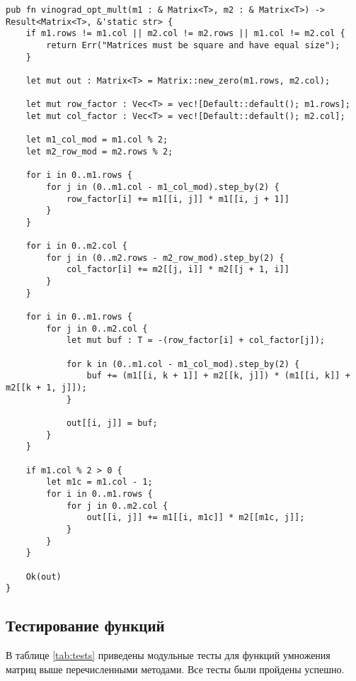 \begin{lstlisting}[caption=Оптимизированный алгоритм умножения матриц Винограда, label=list:vinograd, language={}]
pub fn vinograd_opt_mult(m1 : & Matrix<T>, m2 : & Matrix<T>) -> Result<Matrix<T>, &'static str> {
    if m1.rows != m1.col || m2.col != m2.rows || m1.col != m2.col {
        return Err("Matrices must be square and have equal size");
    }

    let mut out : Matrix<T> = Matrix::new_zero(m1.rows, m2.col);

    let mut row_factor : Vec<T> = vec![Default::default(); m1.rows];
    let mut col_factor : Vec<T> = vec![Default::default(); m2.col];

    let m1_col_mod = m1.col % 2;
    let m2_row_mod = m2.rows % 2;

    for i in 0..m1.rows {
        for j in (0..m1.col - m1_col_mod).step_by(2) {
            row_factor[i] += m1[[i, j]] * m1[[i, j + 1]]
        }
    }

    for i in 0..m2.col {
        for j in (0..m2.rows - m2_row_mod).step_by(2) {
            col_factor[i] += m2[[j, i]] * m2[[j + 1, i]]
        }
    }

    for i in 0..m1.rows {
        for j in 0..m2.col {
            let mut buf : T = -(row_factor[i] + col_factor[j]);

            for k in (0..m1.col - m1_col_mod).step_by(2) {
                buf += (m1[[i, k + 1]] + m2[[k, j]]) * (m1[[i, k]] + m2[[k + 1, j]]);
            }

            out[[i, j]] = buf;
        }
    }

    if m1.col % 2 > 0 {
        let m1c = m1.col - 1;
        for i in 0..m1.rows {
            for j in 0..m2.col {
                out[[i, j]] += m1[[i, m1c]] * m2[[m1c, j]];
            }
        }
    }

    Ok(out)
}
\end{lstlisting}

\subsection{Тестирование функций}

В таблице \ref{tab:tests} приведены модульные тесты для функций умножения матриц выше перечисленными методами. Все тесты были пройдены успешно. \\

